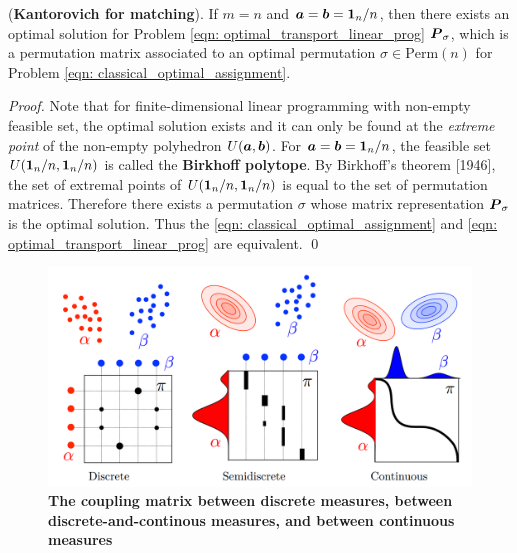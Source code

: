 \documentclass[11pt]{article}
\begin{document}
\begin{proposition}
(\textbf{Kantorovich for matching}). If $m = n$ and  $\boldsymbol{a} = \boldsymbol{b} = \boldsymbol{1}_{n}/n$, then there exists an optimal solution for Problem \eqref{eqn: optimal_transport_linear_prog} $\boldsymbol{P}_{\sigma}$, which is a permutation matrix associated to an optimal permutation $\sigma \in \text{Perm}(n)$ for Problem \eqref{eqn: classical_optimal_assignment}.
\end{proposition}
\begin{proof}
Note that for finite-dimensional linear programming with non-empty feasible set, the optimal solution exists and it can only be found at the \emph{extreme point} of the non-empty polyhedron $U(\boldsymbol{a}, \boldsymbol{b})$. For $\boldsymbol{a} = \boldsymbol{b} = \boldsymbol{1}_{n}/n$, the feasible set $U( \boldsymbol{1}_{n}/n,  \boldsymbol{1}_{n}/n)$ is called the \textbf{Birkhoff polytope}. By Birkhoff's theorem [1946],  the set of extremal points of $U( \boldsymbol{1}_{n}/n,  \boldsymbol{1}_{n}/n)$ is equal to the set of permutation matrices. Therefore there exists a permutation $\sigma$ whose matrix representation $\boldsymbol{P}_{\sigma}$ is the optimal solution. Thus the \eqref{eqn: classical_optimal_assignment} and \eqref{eqn: optimal_transport_linear_prog} are equivalent. \qed
\end{proof}

\begin{figure}
\begin{minipage}[t]{1\linewidth}
  \centering
  \centerline{\includegraphics[scale = 0.3]{coupling_dist.png}}
\end{minipage}
\caption{\footnotesize{\textbf{The coupling matrix between discrete measures, between discrete-and-continous measures, and between continuous measures }}}
\label{fig: coupling_dist}
\end{figure}
\end{document}
